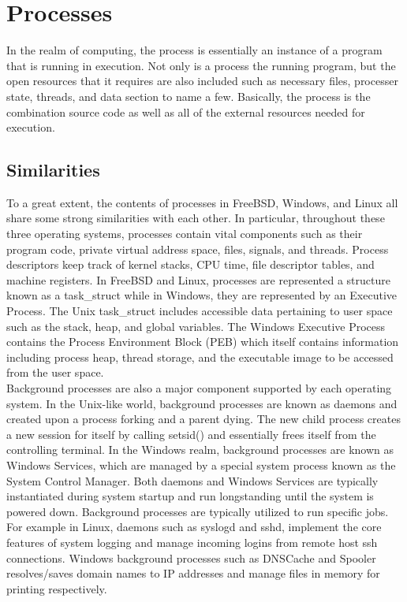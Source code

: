 \documentclass[letterpaper,10pt,titlepage]{article}
\begin{document}
\section{Processes}

In the realm of computing, the process is essentially an instance of a program that is running in execution.  Not only is a process the running program, but the open resources that it requires are also included such as necessary files, processer state, threads, and data section to name a few.  Basically, the process is the combination source code as well as all of the external resources needed for execution.

\subsection{Similarities}

To a great extent, the contents of processes in FreeBSD, Windows, and Linux all share some strong similarities with each other.  In particular, throughout these three operating systems, processes contain vital components such as their program code, private virtual address space, files, signals, and threads.  Process descriptors keep track of kernel stacks, CPU time, file descriptor tables, and machine registers.  In FreeBSD and Linux, processes are represented a structure known as a task\_struct while in Windows, they are represented by an Executive Process.  The Unix task\_struct includes accessible data pertaining to user space such as the stack, heap, and global variables.  The Windows Executive Process contains the Process Environment Block (PEB) which itself contains information including process heap, thread storage, and the executable image to be accessed from the user space.\cite{mwi1}\\

Background processes are also a major component supported by each operating system.  In the Unix-like world, background processes are known as daemons and created upon a process forking and a parent dying.  The new child process creates a new session for itself by calling setsid() and essentially frees itself from the controlling terminal.\cite{lkd4}  In the Windows realm, background processes are known as Windows Services, which are managed by a special system process known as the System Control Manager.\cite{mwi5}  Both daemons and Windows Services are typically instantiated during system startup and run longstanding until the system is powered down.  Background processes are typically utilized to run specific jobs.  For example in Linux, daemons such as syslogd and sshd, implement the core features of system logging and manage incoming logins from remote host ssh connections.\cite{syslogd} Windows background processes such as DNSCache and Spooler resolves/saves domain names to IP addresses and manage files in memory for printing respectively.\cite{mwi2}
\end{document}
